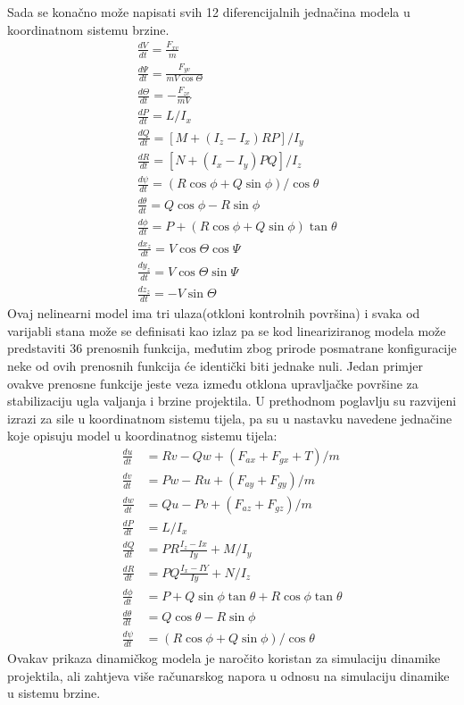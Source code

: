 Sada se konačno može napisati svih 12 diferencijalnih jednačina modela u koordinatnom sistemu brzine.
\begin{align}
    &\frac{dV}{dt} = \frac{F_{xv}}{m}\\
    &\frac{d\Psi}{dt} = \frac{F_{yv}}{mV\cos\Theta}\\
    &\frac{d\Theta}{dt} = -\frac{F_{zv}}{mV}\\
    &\frac{dP}{dt}=L/I_x\\
    &\frac{dQ}{dt}=[M+(I_z-I_x)RP]/I_y\\
    &\frac{dR}{dt}=[N+(I_x-I_y)PQ]/I_z\\
    &\frac{d\psi}{dt}=(R\cos\phi+Q\sin\phi)/\cos\theta\\
    &\frac{d\theta}{dt}=Q\cos\phi-R\sin\phi\\
    &\frac{d\phi}{dt}=P+(R\cos\phi+Q\sin\phi)\tan\theta\\
    &\frac{dx_z}{dt}=V\cos\Theta\cos\Psi\\
    &\frac{dy_z}{dt}=V\cos\Theta\sin\Psi\\
    &\frac{dz_z}{dt}=-V\sin\Theta
\end{align}
Ovaj nelinearni model ima tri ulaza(otkloni kontrolnih površina) i svaka od varijabli stana može se definisati kao izlaz pa se kod lineariziranog 
modela može predstaviti 36 prenosnih funkcija, međutim zbog prirode posmatrane konfiguracije 
neke od ovih prenosnih funkcija će identički biti jednake nuli. Jedan primjer ovakve prenosne funkcije 
jeste veza između otklona upravljačke površine za stabilizaciju ugla valjanja i brzine projektila. 
U prethodnom poglavlju su razvijeni izrazi za sile u koordinatnom sistemu tijela, pa su u nastavku navedene 
jednačine koje opisuju model u koordinatnog sistemu tijela:
\begin{align}
    \label{eq:prva} \frac{du}{dt} &=Rv - Qw + (F_{ax} + F_{gx} + T)/m\\
    \frac{dv}{dt} &=Pw - Ru + (F_{ay}+F_{gy})/m\\
    \frac{dw}{dt} &=Qu - Pv +(F_{az}+F_{gz})/m\\
    \frac{dP}{dt} &=L/I_x\\
    \frac{dQ}{dt} &= PR\frac{I_z-Ix}{Iy} + M/I_y\\
    \frac{dR}{dt} &= PQ\frac{I_x-IY}{Iy} + N/I_z\\
    \frac{d\phi}{dt} &=P + Q\sin\phi\tan\theta + R\cos\phi\tan\theta\\
    \frac{d\theta}{dt} &=Q\cos\theta - R\sin\phi\\
    \label{eq:zadnja} \frac{d\psi}{dt}&=(R\cos\phi+Q\sin\phi)/\cos\theta
\end{align}
Ovakav prikaza dinamičkog modela je naročito koristan za simulaciju dinamike projektila, ali 
zahtjeva više računarskog napora u odnosu na simulaciju dinamike u sistemu brzine. 
